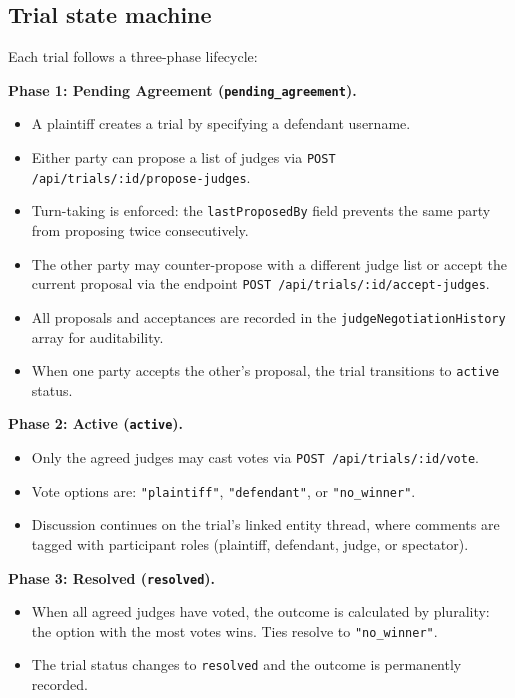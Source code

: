 \documentclass[13pt,a4paper]{report}
\begin{document}
\subsection{Trial state machine}
Each trial follows a three-phase lifecycle:

\textbf{Phase 1: Pending Agreement (\texttt{pending\_agreement}).}
\begin{itemize}
    \item A plaintiff creates a trial by specifying a defendant username.
    \item Either party can propose a list of judges via \texttt{POST /api/trials/:id/propose-judges}.
    \item Turn-taking is enforced: the \texttt{lastProposedBy} field prevents the same party from proposing twice consecutively.
    \item The other party may counter-propose with a different judge list or accept the current proposal via the endpoint
    \texttt{POST /api/trials/:id/\hspace{0pt}accept\hspace{0pt}-judges}.
    \item All proposals and acceptances are recorded in the \texttt{judgeNegotiationHistory} array for auditability.
    \item When one party accepts the other's proposal, the trial transitions to \texttt{active} status.
\end{itemize}

\textbf{Phase 2: Active (\texttt{active}).}
\begin{itemize}
    \item Only the agreed judges may cast votes via \texttt{POST /api/trials/:id/vote}.
    \item Vote options are: \texttt{"plaintiff"}, \texttt{"defendant"}, or \texttt{"no\_winner"}.
    \item Discussion continues on the trial's linked entity thread, where comments are tagged with participant roles (plaintiff, defendant, judge, or spectator).
\end{itemize}

\textbf{Phase 3: Resolved (\texttt{resolved}).}
\begin{itemize}
    \item When all agreed judges have voted, the outcome is calculated by plurality: the option with the most votes wins. Ties resolve to \texttt{"no\_winner"}.
    \item The trial status changes to \texttt{resolved} and the outcome is permanently recorded.
\end{itemize}
\end{document}
